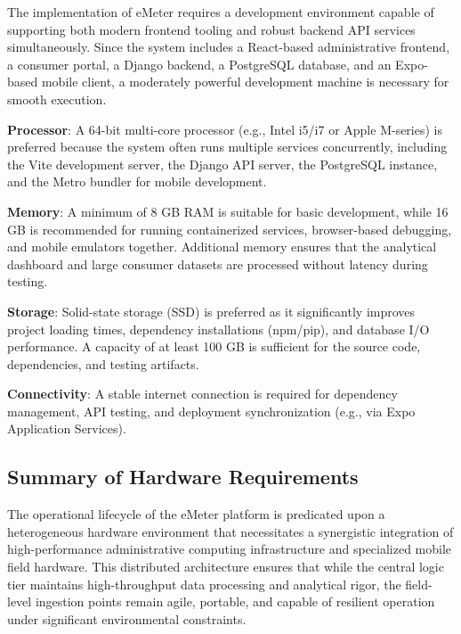 \documentclass[12pt, a4paper, onecolumn]{report}
\begin{document}
The implementation of eMeter requires a development environment capable of supporting both modern frontend tooling and robust backend API services simultaneously. Since the system includes a React-based administrative frontend, a consumer portal, a Django backend, a PostgreSQL database, and an Expo-based mobile client, a moderately powerful development machine is necessary for smooth execution.

\textbf{Processor}: A 64-bit multi-core processor (e.g., Intel i5/i7 or Apple M-series) is preferred because the system often runs multiple services concurrently, including the Vite development server, the Django API server, the PostgreSQL instance, and the Metro bundler for mobile development.

\textbf{Memory}: A minimum of 8 GB RAM is suitable for basic development, while 16 GB is recommended for running containerized services, browser-based debugging, and mobile emulators together. Additional memory ensures that the analytical dashboard and large consumer datasets are processed without latency during testing.

\textbf{Storage}: Solid-state storage (SSD) is preferred as it significantly improves project loading times, dependency installations (npm/pip), and database I/O performance. A capacity of at least 100 GB is sufficient for the source code, dependencies, and testing artifacts.

\textbf{Connectivity}: A stable internet connection is required for dependency management, API testing, and deployment synchronization (e.g., via Expo Application Services).

\subsection{Summary of Hardware Requirements}

The operational lifecycle of the eMeter platform is predicated upon a heterogeneous hardware environment that necessitates a synergistic integration of high-performance administrative computing infrastructure and specialized mobile field hardware. This distributed architecture ensures that while the central logic tier maintains high-throughput data processing and analytical rigor, the field-level ingestion points remain agile, portable, and capable of resilient operation under significant environmental constraints.
\end{document}
